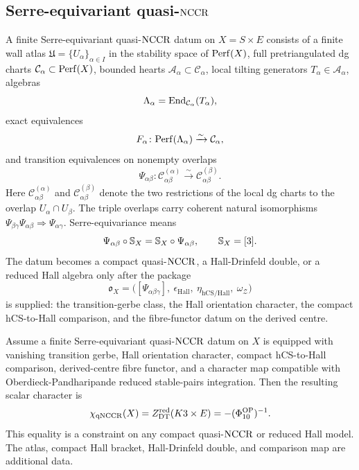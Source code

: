 \subsection*{Serre-equivariant quasi-\(\mathrm{NCCR}\)}

\begin{definition}
\label{def:serre-qnccr-k3e}
A finite Serre-equivariant quasi-\(\mathrm{NCCR}\) datum on \(X=S\times E\)
consists of a finite wall atlas \(\mathfrak U=\{U_\alpha\}_{\alpha\in I}\)
in the stability space of \(\mathrm{Perf}(X)\), full pretriangulated dg charts
\(\mathcal C_\alpha\subset\mathrm{Perf}(X)\), bounded hearts
\(\mathcal A_\alpha\subset\mathcal C_\alpha\), local tilting
generators \(T_\alpha\in\mathcal A_\alpha\), algebras
\[
  \Lambda_\alpha=\mathrm{End}_{\mathcal C_\alpha}(T_\alpha),
\]
exact equivalences
\[
  F_\alpha\colon \mathrm{Perf}(\Lambda_\alpha)\xrightarrow{\sim}
  \mathcal C_\alpha,
\]
and transition equivalences on nonempty overlaps
\[
  \Psi_{\alpha\beta}\colon
  \mathcal C_{\alpha\beta}^{(\alpha)}
  \xrightarrow{\sim}
  \mathcal C_{\alpha\beta}^{(\beta)} .
\]
Here \(\mathcal C_{\alpha\beta}^{(\alpha)}\) and
\(\mathcal C_{\alpha\beta}^{(\beta)}\) denote the two restrictions of
the local dg charts to the overlap \(U_\alpha\cap U_\beta\).
The triple overlaps carry coherent natural isomorphisms
\(\Psi_{\beta\gamma}\Psi_{\alpha\beta}\Rightarrow
\Psi_{\alpha\gamma}\).  Serre-equivariance means
\[
  \Psi_{\alpha\beta}\circ\mathbb{S}_X
  =
  \mathbb{S}_X\circ\Psi_{\alpha\beta},
  \qquad
  \mathbb{S}_X=[3].
\]
The datum becomes a compact quasi-\(\mathrm{NCCR}\), a Hall-Drinfeld double,
or a reduced Hall algebra only after the package
\[
  \mathfrak o_X=
  \bigl(
    [\Psi_{\alpha\beta\gamma}],\
    \epsilon_{\mathrm{Hall}},\
    \eta_{\mathrm{hCS/Hall}},\
    \omega_{\mathcal Z}
  \bigr)
\]
is supplied: the transition-gerbe class, the Hall orientation
character, the compact hCS-to-Hall comparison, and the fibre-functor
datum on the derived centre.
\end{definition}

\begin{proposition}[Reduced Hall character constraint]
\label{prop:reduced-hall-character-k3e}
Assume a finite Serre-equivariant quasi-\(\mathrm{NCCR}\) datum on \(X\) is
equipped with vanishing transition gerbe, Hall orientation character,
compact hCS-to-Hall comparison, derived-centre fibre functor, and a
character map compatible with Oberdieck-Pandharipande reduced
stable-pairs integration.  Then the resulting scalar character is
\[
  \chi_{\mathrm{qNCCR}}(X)
  =
  Z^{\mathrm{red}}_{\mathrm{DT}}(K3\times E)
  =
  -(\Phi_{10}^{\mathrm{OP}})^{-1}.
\]
This equality is a constraint on any compact quasi-\(\mathrm{NCCR}\) or reduced
Hall model.  The atlas, compact Hall bracket, Hall-Drinfeld double, and
comparison map are additional data.
\end{proposition}

